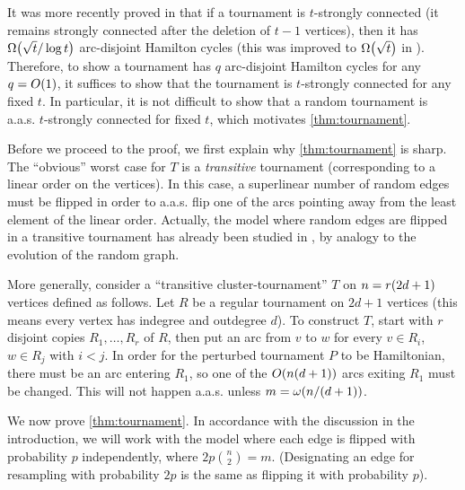\documentclass[11pt,english]{article}
\theoremstyle{plain}
\theoremstyle{definition}
\theoremstyle{definition}
\theoremstyle{plain}
\theoremstyle{plain}
\theoremstyle{plain}
\theoremstyle{plain}
\theoremstyle{remark}
\theoremstyle{remark}
\let\originalleft\left
\let\originalright\right
\renewcommand{\left}{\mathopen{}\mathclose\bgroup\originalleft}
\renewcommand{\right}{\aftergroup\egroup\originalright}
\begin{document}
It was more recently proved in \cite{KLOP14} that if a tournament
is $t$-strongly connected (it remains strongly connected after the
deletion of $t-1$ vertices), then it has $\Omega\left(\sqrt{t}/\log t\right)$
arc-disjoint Hamilton cycles (this was improved to $\Omega\left(\sqrt{t}\right)$
in \cite{Pok14}). Therefore, to show a tournament has $q$ arc-disjoint Hamilton cycles for any $q=O\left(1\right)$, it suffices to show that the tournament is $t$-strongly connected for any fixed $t$. In particular, it is not difficult to show that a random tournament is a.a.s. $t$-strongly connected for fixed $t$, which motivates \ref{thm:tournament}.

Before we proceed to the proof, we first explain why \ref{thm:tournament}
is sharp. The ``obvious'' worst case for $T$ is a \emph{transitive}
tournament (corresponding to a linear order on the vertices). In this
case, a superlinear number of random edges must be flipped in order to a.a.s.
flip one of the arcs pointing away from the least element of the linear
order. Actually, the model where random edges are flipped in a transitive
tournament has already been studied in \cite{LRG96}, by analogy to
the evolution of the random graph.

More generally, consider a ``transitive cluster-tournament'' $T$
on $n=r\left(2d+1\right)$ vertices defined as follows. Let $R$ be a regular tournament
on $2d+1$ vertices (this means every vertex has indegree and outdegree $d$). To construct $T$, start with $r$ disjoint copies
$R_{1},\dots,R_{r}$ of $R$, then put an arc from $v$ to $w$ for
every $v\in R_{i}$, $w\in R_{j}$ with $i<j$. In order for the perturbed
tournament $P$ to be Hamiltonian, there must be an arc entering $R_{1}$,
so one of the $O\left(n\left(d+1\right)\right)$ arcs exiting $R_{1}$
must be changed. This will not happen a.a.s. unless $m=\omega\left(n/\left(d+1\right)\right)$.

We now prove \ref{thm:tournament}. In accordance with the discussion
in the introduction, we will work with the model where each edge is
flipped with probability $p$ independently, where $2p{n \choose 2}=m$.
(Designating an edge for resampling with probability $2p$ is the
same as flipping it with probability $p$).
\end{document}
